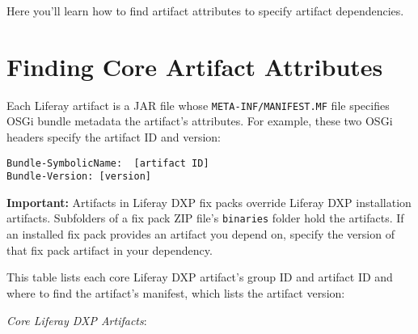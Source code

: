 Here you'll learn how to find artifact attributes to specify artifact
dependencies.

\section{Finding Core Artifact
Attributes}\label{finding-core-artifact-attributes}

Each Liferay artifact is a JAR file whose \texttt{META-INF/MANIFEST.MF}
file specifies OSGi bundle metadata the artifact's attributes. For
example, these two OSGi headers specify the artifact ID and version:

\begin{verbatim}
Bundle-SymbolicName:  [artifact ID]
Bundle-Version: [version]
\end{verbatim}

\noindent\hrulefill

\textbf{Important:} Artifacts in Liferay DXP fix packs override Liferay
DXP installation artifacts. Subfolders of a fix pack ZIP file's
\texttt{binaries} folder hold the artifacts. If an installed fix pack
provides an artifact you depend \textbar{} on, specify the version of
that fix pack artifact in your dependency.

\noindent\hrulefill

This table lists each core Liferay DXP artifact's group ID and artifact
ID and where to find the artifact's manifest, which lists the artifact
version:

\emph{Core Liferay DXP Artifacts}:

